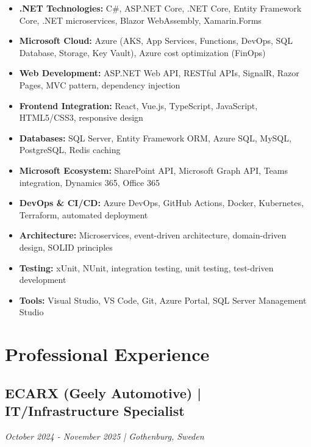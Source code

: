 \documentclass[11pt,a4paper]{article}
\begin{document}
\begin{itemize}[leftmargin=*, itemsep=2pt]
\item \textbf{.NET Technologies:} C\#, ASP.NET Core, .NET Core, Entity Framework Core, .NET microservices, Blazor WebAssembly, Xamarin.Forms
\item \textbf{Microsoft Cloud:} Azure (AKS, App Services, Functions, DevOps, SQL Database, Storage, Key Vault), Azure cost optimization (FinOps)
\item \textbf{Web Development:} ASP.NET Web API, RESTful APIs, SignalR, Razor Pages, MVC pattern, dependency injection
\item \textbf{Frontend Integration:} React, Vue.js, TypeScript, JavaScript, HTML5/CSS3, responsive design
\item \textbf{Databases:} SQL Server, Entity Framework ORM, Azure SQL, MySQL, PostgreSQL, Redis caching
\item \textbf{Microsoft Ecosystem:} SharePoint API, Microsoft Graph API, Teams integration, Dynamics 365, Office 365
\item \textbf{DevOps \& CI/CD:} Azure DevOps, GitHub Actions, Docker, Kubernetes, Terraform, automated deployment
\item \textbf{Architecture:} Microservices, event-driven architecture, domain-driven design, SOLID principles
\item \textbf{Testing:} xUnit, NUnit, integration testing, unit testing, test-driven development
\item \textbf{Tools:} Visual Studio, VS Code, Git, Azure Portal, SQL Server Management Studio
\end{itemize}

\section*{Professional Experience}

\subsection*{ECARX (Geely Automotive) | IT/Infrastructure Specialist}
\textit{October 2024 - November 2025 | Gothenburg, Sweden}
\end{document}
